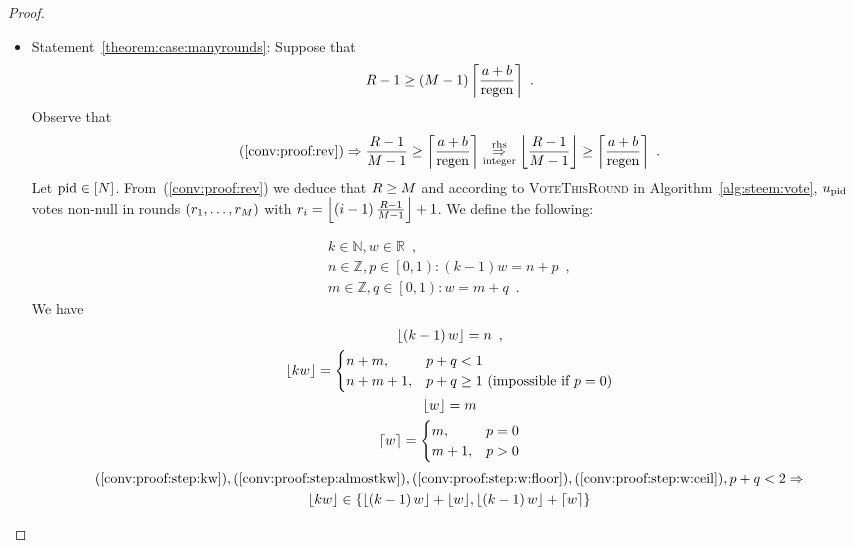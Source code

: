 \documentclass[a4paper,english,cleveref, autoref]{oasics-v2019}
\begin{document}
\begin{subappendices}
\begin{proof}
\begin{itemize}
    \item Statement~\ref{theorem:case:manyrounds}: Suppose that
    \begin{equation}
      \label{conv:proof:rev}
      \rounds - 1 \geq \left(\postlen - 1\right)\ceil*{\frac{a+b}{\regen}}
      \enspace.
    \end{equation}
    Observe that
    \begin{equation}
      \label{conv:proof:integer}
      \left(\ref{conv:proof:rev}\right) \Rightarrow \frac{\rounds - 1}{\postlen
      - 1} \geq \ceil*{\frac{a+b}{\regen}}
      \underset{\text{integer}}{\overset{\text{rhs}}{\Rightarrow}}
      \floor*{\frac{\rounds - 1}{\postlen - 1}} \geq \ceil*{\frac{a+b}{\regen}}
      \enspace.
    \end{equation}
    Let $\pid \in \left[\playerlen\right]$. From~(\ref{conv:proof:rev}) we
    deduce that $\rounds \geq \postlen$ and according to \textsc{VoteThisRound}
    in Algorithm~\ref{alg:steem:vote}, $u_{\pid}$ votes non-null in rounds
    $\left(\round_1, \dots, \round_\postlen\right)$ with $r_i = \floor*{\left(i
    - 1\right)\frac{\rounds - 1}{\postlen - 1}} + 1$. We define the following:

    \begin{gather*}
      k \in \mathbb{N}, w \in \mathbb{R} \enspace, \\
      n \in \mathbb{Z}, p \in \left[0, 1\right) : \left(k - 1\right)w = n + p
      \enspace, \\
      m \in \mathbb{Z}, q \in \left[0, 1\right) : w = m + q \enspace.
    \end{gather*}
    We have
    \begin{gather}
      \label{conv:proof:step:kw}
      \floor*{\left(k - 1\right)w} = n \enspace, \\
      \label{conv:proof:step:almostkw}
      \floor*{kw} =
      \begin{cases}
        n + m, & p + q < 1 \\
        n + m + 1, & p + q \geq 1 \text{ (impossible if } p = 0\text{)}
      \end{cases} \\
      \label{conv:proof:step:w:floor}
      \floor*{w} = m \\
      \label{conv:proof:step:w:ceil}
      \ceil*{w} =
      \begin{cases}
        m, & p = 0 \\
        m + 1, & p > 0
      \end{cases}
    \end{gather}
    \begin{equation}
      \label{conv:proof:step:floors}
      \begin{gathered}
        (\ref{conv:proof:step:kw}), (\ref{conv:proof:step:almostkw}),
        (\ref{conv:proof:step:w:floor}), (\ref{conv:proof:step:w:ceil}), p + q <
        2 \Rightarrow \\
        \floor*{kw} \in \left\{\floor*{\left(k - 1\right)w} + \floor*{w},
        \floor*{\left(k - 1\right)w} + \ceil*{w}\right\}
      \end{gathered}
    \end{equation}


\end{itemize}
\end{proof}
\end{subappendices}
\end{document}
